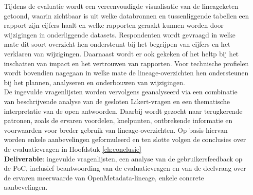 Tijdens de evaluatie wordt een vereenvoudigde visualisatie van de lineageketen getoond, waarin zichtbaar is uit welke databronnen en tussenliggende tabellen een rapport zijn cijfers haalt en welke rapporten geraakt kunnen worden door wijzigingen in onderliggende datasets. Respondenten wordt gevraagd in welke mate dit soort overzicht hen ondersteunt bij het begrijpen van cijfers en het verklaren van wijzigingen. Daarnaast wordt er ook gekeken of het heltp bij het inschatten van impact en het vertrouwen van rapporten. Voor technische profielen wordt bovendien nagegaan in welke mate de lineage-overzichten hen ondersteunen bij het plannen, analyseren en onderbouwen van wijzigingen.\\

De ingevulde vragenlijsten worden vervolgens geanalyseerd via een combinatie van beschrijvende analyse van de gesloten Likert-vragen en een thematische interpretatie van de open antwoorden. Daarbij wordt gezocht naar terugkerende patronen, zoals de ervaren voordelen, knelpunten, ontbrekende informatie en voorwaarden voor breder gebruik van lineage-overzichten. Op basis hiervan worden enkele aanbevelingen geformuleerd en ten slotte volgen de conclusies over de evaluatievragen in Hoofdstuk \ref{ch:conclusie}\\

\textbf{Deliverable}: ingevulde vragenlijsten, een analyse van de gebruikersfeedback op de PoC, inclusief beantwoording van de evaluatievragen en van de deelvraag over de ervaren meerwaarde van OpenMetadata-lineage, enkele concrete aanbevelingen.
